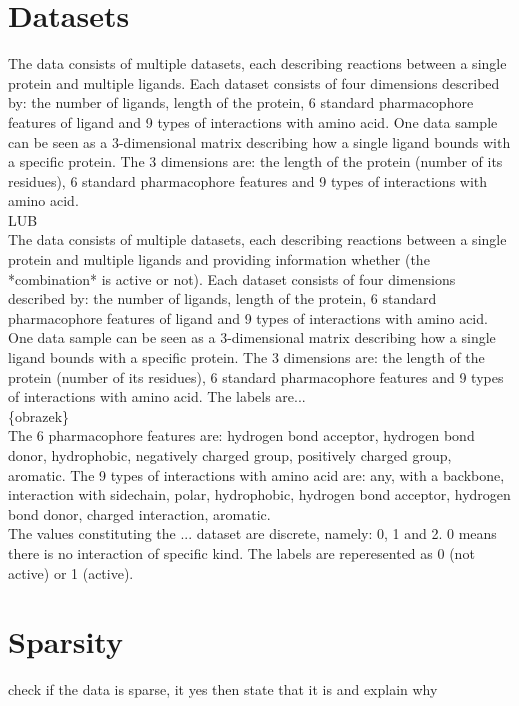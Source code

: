 \documentclass[a4paper,10pt]{report}
\begin{document}
    \section{Datasets}
    The data consists of multiple datasets, each describing reactions between a single protein and multiple ligands. Each dataset consists of four dimensions described by: the number of ligands, length of the protein, 6 standard pharmacophore features of ligand and 9 types of interactions with amino acid\cite{2DSIFT}. One data sample can be seen as a 3-dimensional matrix describing how a single ligand bounds with a specific protein. The 3 dimensions are: the length of the protein (number of its residues), 6 standard pharmacophore features and 9 types of interactions with amino acid. \\

    LUB \\
    
    The data consists of multiple datasets, each describing reactions between a single protein and multiple ligands and providing information whether (the *combination* is active or not). Each dataset consists of four dimensions described by: the number of ligands, length of the protein, 6 standard pharmacophore features of ligand and 9 types of interactions with amino acid\cite{2DSIFT}. One data sample can be seen as a 3-dimensional matrix describing how a single ligand bounds with a specific protein. The 3 dimensions are: the length of the protein (number of its residues), 6 standard pharmacophore features and 9 types of interactions with amino acid. The labels are... \\
    
    \{obrazek\} \\ %
    
    The 6 pharmacophore features are: hydrogen bond acceptor, hydrogen bond donor, hydrophobic, negatively charged group, positively charged group, aromatic. The 9 types of interactions with amino acid are: any, with a backbone, interaction with sidechain, polar, hydrophobic, hydrogen bond acceptor, hydrogen bond donor, charged interaction, aromatic. \\
    
    The values constituting the ... dataset are discrete, namely: 0, 1 and 2. 0 means there is no interaction of specific kind. The labels are reperesented as 0 (not active) or 1 (active).
    
    \section{Sparsity} %
    check if the data is sparse, it yes then state that it is and explain why
    
\end{document}
